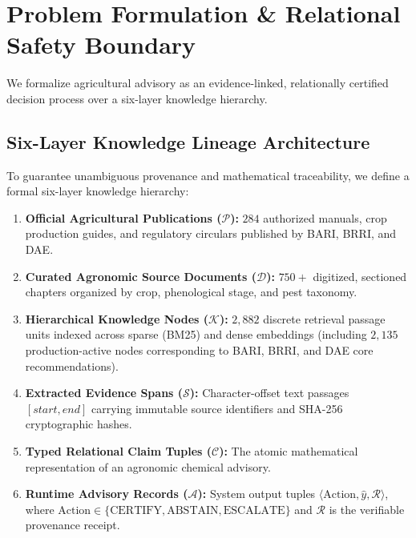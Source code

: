 \documentclass[11pt,a4paper]{article}
\begin{document}
\section{Problem Formulation \& Relational Safety Boundary}
\label{sec:problem_formulation}

We formalize agricultural advisory as an evidence-linked, relationally certified decision process over a six-layer knowledge hierarchy.

\subsection{Six-Layer Knowledge Lineage Architecture}
To guarantee unambiguous provenance and mathematical traceability, we define a formal six-layer knowledge hierarchy:
\begin{enumerate}[leftmargin=1.8em]
    \item \textbf{Official Agricultural Publications ($\mathcal{P}$):} $284$ authorized manuals, crop production guides, and regulatory circulars published by BARI, BRRI, and DAE.
    \item \textbf{Curated Agronomic Source Documents ($\mathcal{D}$):} $750+$ digitized, sectioned chapters organized by crop, phenological stage, and pest taxonomy.
    \item \textbf{Hierarchical Knowledge Nodes ($\mathcal{K}$):} $2,882$ discrete retrieval passage units indexed across sparse (BM25) and dense embeddings (including $2,135$ production-active nodes corresponding to BARI, BRRI, and DAE core recommendations).
    \item \textbf{Extracted Evidence Spans ($\mathcal{S}$):} Character-offset text passages $[start, end]$ carrying immutable source identifiers and SHA-256 cryptographic hashes.
    \item \textbf{Typed Relational Claim Tuples ($\mathcal{C}$):} The atomic mathematical representation of an agronomic chemical advisory.
    \item \textbf{Runtime Advisory Records ($\mathcal{A}$):} System output tuples $\langle \text{Action}, \hat{y}, \mathcal{R} \rangle$, where $\text{Action} \in \{\text{CERTIFY}, \text{ABSTAIN}, \text{ESCALATE}\}$ and $\mathcal{R}$ is the verifiable provenance receipt.
\end{enumerate}
\end{document}
